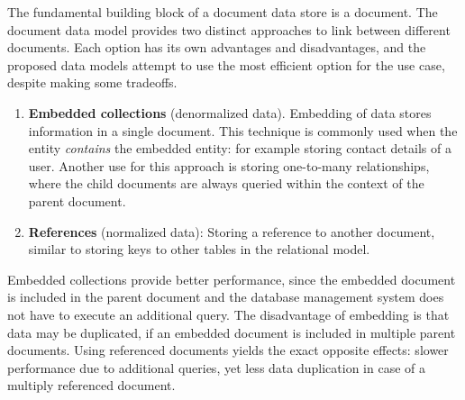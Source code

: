 



The fundamental building block of a document data store is a document.
The document data model provides two distinct approaches to link between different documents.
Each option has its own advantages and disadvantages, and the proposed data models attempt to use the most efficient option for the use case, despite making some tradeoffs.

\begin{enumerate}
  \item \textbf{Embedded collections} (denormalized data).
        Embedding of data stores information in a single document.
        This technique is commonly used when the entity \textit{contains} the embedded entity: for example storing contact details of a user.
        Another use for this approach is storing one-to-many relationships, where the child documents are always queried within the context of the parent document.
  \item \textbf{References} (normalized data): Storing a reference to another document, similar to storing keys to other tables in the relational model.
\end{enumerate}

Embedded collections provide better performance, since the embedded document is included in the parent document and the database management system does not have to execute an additional query.
The disadvantage of embedding is that data may be duplicated, if an embedded document is included in multiple parent documents.
Using referenced documents yields the exact opposite effects: slower performance due to additional queries, yet less data duplication in case of a multiply referenced document.


